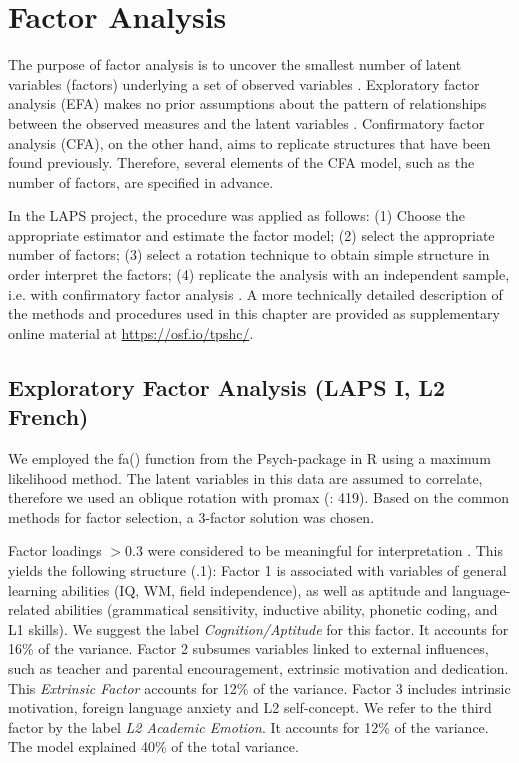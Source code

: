 \documentclass[output=paper]{langsci/langscibook}
\begin{document}
\section{Factor Analysis}

The purpose of factor analysis is to uncover the smallest number of latent variables (factors) underlying a set of observed variables \citep{Brown2006}. Exploratory factor analysis (EFA) makes no prior assumptions about the pattern of relationships between the observed measures and the latent variables \citep{Brown2006}. Confirmatory factor analysis (CFA), on the other hand, aims to replicate structures that have been found previously. Therefore, several elements of the CFA model, such as the number of factors, are specified in advance.

In the LAPS project, the procedure was applied as follows: (1) Choose the appropriate estimator and estimate the factor model; (2) select the appropriate number of factors; (3) select a rotation technique to obtain simple structure in order interpret the factors; (4) replicate the analysis with an independent sample, i.e. with confirmatory factor analysis \citep{Brown2006}. A more technically detailed description of the methods and procedures used in this chapter are provided as supplementary online material at \url{https://osf.io/tpshc/}.

\subsection{Exploratory Factor Analysis (LAPS I, L2 French)}

We employed the fa() function from the Psych-package in R \citep{Revelle2018} using a maximum likelihood method. The latent variables in this data are assumed to correlate, therefore we used an oblique rotation with promax (\citealt{BortzSchuster2010}: 419). Based on the common methods for factor selection, a 3-factor solution was chosen. 



Factor loadings $> 0.3$ were considered to be meaningful for interpretation \citep[30]{Brown2006}. This yields the following structure (.1): Factor 1 is associated with variables of general learning abilities (IQ, WM, field independence), as well as aptitude and language-related abilities (grammatical sensitivity, inductive ability, phonetic coding, and L1 skills). We suggest the label \textit{Cognition/Aptitude} for this factor. It accounts for 16\% of the variance. Factor 2 subsumes variables linked to external influences, such as teacher and parental encouragement, extrinsic motivation and dedication. This \textit{Extrinsic Factor} accounts for 12\% of the variance. Factor 3 includes intrinsic motivation, foreign language anxiety and L2 self-concept. We refer to the third factor by the label \textit{L2 Academic Emotion}. It accounts for 12\% of the variance. The model explained 40\% of the total variance. 
\end{document}
